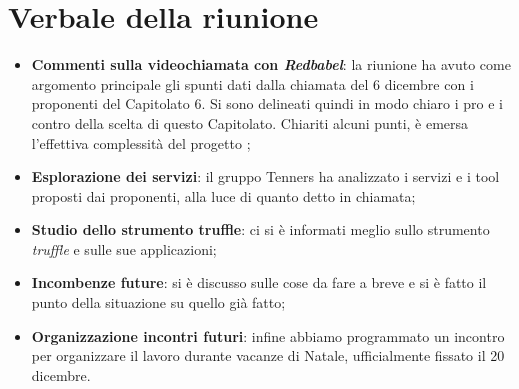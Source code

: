 \section{Verbale della riunione}
	\begin{itemize}
		\item \textbf{Commenti sulla videochiamata con \textit{Redbabel}}:
        la riunione ha avuto come argomento principale gli spunti dati dalla chiamata del 6 dicembre con i proponenti del Capitolato 6. Si sono delineati quindi in modo chiaro i pro e i contro della scelta di questo Capitolato. Chiariti alcuni punti, è emersa l'effettiva complessità del progetto ;
		\item \textbf{Esplorazione dei servizi}:
		il gruppo Tenners ha analizzato i servizi e i tool proposti dai proponenti, alla luce di quanto detto in chiamata;
		\item \textbf{Studio dello strumento truffle}: ci si è informati meglio sullo strumento \textit{truffle} e sulle sue applicazioni;
        \item \textbf{Incombenze future}: si è discusso sulle cose da fare a breve e si è fatto il punto della situazione su quello già fatto;
		\item \textbf{Organizzazione incontri futuri}: infine abbiamo programmato un incontro per organizzare il lavoro durante vacanze di Natale, ufficialmente fissato il 20 dicembre.
	\end{itemize}

